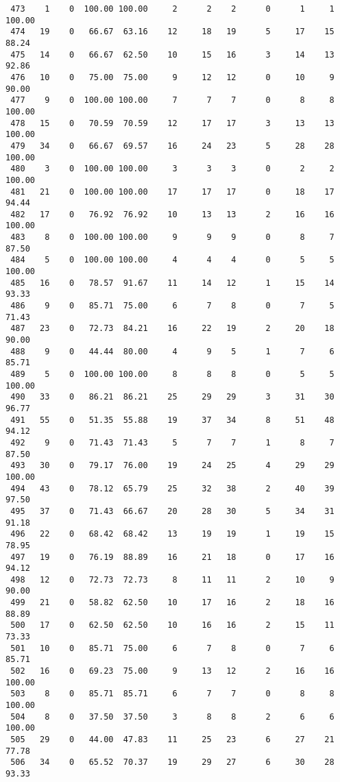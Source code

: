 \begin{verbatim}
 473    1    0  100.00 100.00     2      2    2      0      1     1   100.00
 474   19    0   66.67  63.16    12     18   19      5     17    15    88.24
 475   14    0   66.67  62.50    10     15   16      3     14    13    92.86
 476   10    0   75.00  75.00     9     12   12      0     10     9    90.00
 477    9    0  100.00 100.00     7      7    7      0      8     8   100.00
 478   15    0   70.59  70.59    12     17   17      3     13    13   100.00
 479   34    0   66.67  69.57    16     24   23      5     28    28   100.00
 480    3    0  100.00 100.00     3      3    3      0      2     2   100.00
 481   21    0  100.00 100.00    17     17   17      0     18    17    94.44
 482   17    0   76.92  76.92    10     13   13      2     16    16   100.00
 483    8    0  100.00 100.00     9      9    9      0      8     7    87.50
 484    5    0  100.00 100.00     4      4    4      0      5     5   100.00
 485   16    0   78.57  91.67    11     14   12      1     15    14    93.33
 486    9    0   85.71  75.00     6      7    8      0      7     5    71.43
 487   23    0   72.73  84.21    16     22   19      2     20    18    90.00
 488    9    0   44.44  80.00     4      9    5      1      7     6    85.71
 489    5    0  100.00 100.00     8      8    8      0      5     5   100.00
 490   33    0   86.21  86.21    25     29   29      3     31    30    96.77
 491   55    0   51.35  55.88    19     37   34      8     51    48    94.12
 492    9    0   71.43  71.43     5      7    7      1      8     7    87.50
 493   30    0   79.17  76.00    19     24   25      4     29    29   100.00
 494   43    0   78.12  65.79    25     32   38      2     40    39    97.50
 495   37    0   71.43  66.67    20     28   30      5     34    31    91.18
 496   22    0   68.42  68.42    13     19   19      1     19    15    78.95
 497   19    0   76.19  88.89    16     21   18      0     17    16    94.12
 498   12    0   72.73  72.73     8     11   11      2     10     9    90.00
 499   21    0   58.82  62.50    10     17   16      2     18    16    88.89
 500   17    0   62.50  62.50    10     16   16      2     15    11    73.33
 501   10    0   85.71  75.00     6      7    8      0      7     6    85.71
 502   16    0   69.23  75.00     9     13   12      2     16    16   100.00
 503    8    0   85.71  85.71     6      7    7      0      8     8   100.00
 504    8    0   37.50  37.50     3      8    8      2      6     6   100.00
 505   29    0   44.00  47.83    11     25   23      6     27    21    77.78
 506   34    0   65.52  70.37    19     29   27      6     30    28    93.33

\end{verbatim}
